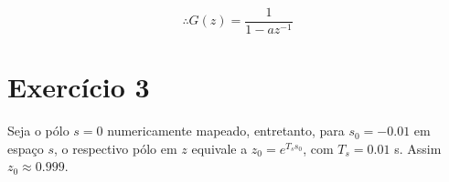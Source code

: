 \documentclass[twoside, fleqn]{article}
\begin{document}
\begin{enumerate}
\begin{itemize}
                    \begin{equation}
                        \therefore G(z) = \frac{1}{1 - a z^{-1}}
                    \end{equation}
            \end{itemize}
        \end{enumerate}
    
    \section*{Exercício 3}
    \label{sec:ex3}
    
    Seja o pólo $s=0$ numericamente mapeado, entretanto, para $s_0 = -0.01$ em espaço $s$, o respectivo pólo em $z$ equivale a $z_0 = e^{T_s s_0}$, com $T_s = 0.01$ s. Assim $z_0 \approx 0.999$.
    
\end{document}
